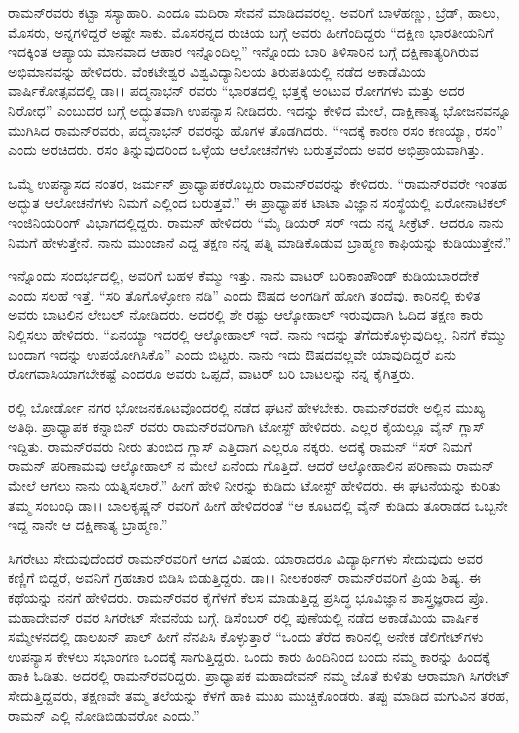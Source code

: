 ರಾಮನ್‍ರವರು ಕಟ್ಟಾ ಸಸ್ಯಾಹಾರಿ. ಎಂದೂ ಮದಿರಾ ಸೇವನೆ ಮಾಡಿದವರಲ್ಲ. ಅವರಿಗೆ ಬಾಳೆಹಣ್ಣು, ಬ್ರೆಡ್, ಹಾಲು, ಮೊಸರು, ಅನ್ನಗಳಿದ್ದರೆ ಅಷ್ಟೇ ಸಾಕು. ಮೊಸರನ್ನದ ರುಚಿಯ ಬಗ್ಗೆ ಅವರು ಹೀಗೆಂದಿದ್ದರು\enginline{--} “ದಕ್ಷಿಣ ಭಾರತೀಯನಿಗೆ ಇದಕ್ಕಿಂತ ಆಪ್ಯಾಯ ಮಾನವಾದ ಆಹಾರ ಇನ್ನೊಂದಿಲ್ಲ” ಇನ್ನೊಂದು ಬಾರಿ ತಿಳಿಸಾರಿನ ಬಗ್ಗೆ ದಕ್ಷಿಣಾತ್ಯರಿಗಿರುವ ಅಭಿಮಾನವನ್ನು ಹೇಳಿದರು. ವೆಂಕಟೇಶ್ವರ ವಿಶ್ವವಿದ್ಯಾನಿಲಯ ತಿರುಪತಿಯಲ್ಲಿ ನಡೆದ ಅಕಾಡೆಮಿಯ ವಾರ್ಷಿಕೋತ್ಸವದಲ್ಲಿ ಡಾ।। ಪದ್ಮನಾಭನ್ ರವರು “ಭಾರತದಲ್ಲಿ ಭತ್ತಕ್ಕೆ ಅಂಟುವ ರೋಗಗಳು ಮತ್ತು ಅದರ ನಿರೋಧ” \textit{} ಎಂಬುದರ ಬಗ್ಗೆ ಅದ್ಭುತವಾಗಿ ಉಪನ್ಯಾಸ ನೀಡಿದರು. ಇದನ್ನು ಕೇಳಿದ ಮೇಲೆ, ದಾಕ್ಷಿಣಾತ್ಯ ಭೋಜನವನ್ನೂ ಮುಗಿಸಿದ ರಾಮನ್‍ರವರು, ಪದ್ಮನಾಭನ್ ರವರನ್ನು ಹೊಗಳ ತೊಡಗಿದರು. “ಇದಕ್ಕೆ ಕಾರಣ ರಸಂ ಕಣಯ್ಯಾ, ರಸಂ” ಎಂದು ಅರಚಿದರು. ರಸಂ ತಿನ್ನುವುದರಿಂದ ಒಳ್ಳೆಯ ಆಲೋಚನೆಗಳು ಬರುತ್ತವೆಂದು ಅವರ ಅಭಿಪ್ರಾಯವಾಗಿತ್ತು.

ಒಮ್ಮೆ ಉಪನ್ಯಾಸದ ನಂತರ, ಜರ್ಮನ್ ಪ್ರಾಧ್ಯಾಪಕರೊಬ್ಬರು ರಾಮನ್‍ರವರನ್ನು ಕೇಳಿದರು. “ರಾಮನ್‍ರವರೇ ಇಂತಹ ಅದ್ಭುತ ಆಲೋಚನೆಗಳು ನಿಮಗೆ ಎಲ್ಲಿಂದ ಬರುತ್ತವೆ.” ಈ ಪ್ರಾಧ್ಯಾಪಕ ಟಾಟಾ ವಿಜ್ಞಾನ ಸಂಸ್ಥೆಯಲ್ಲಿ ಏರೋನಾಟಿಕಲ್ ಇಂಜಿನಿಯರಿಂಗ್ ವಿಭಾಗದಲ್ಲಿದ್ದರು. ರಾಮನ್ ಹೇಳಿದರು\enginline{--} “ಮೈ ಡಿಯರ್ ಸರ್ ಇದು ನನ್ನ ಸೀಕ್ರೆಟ್. ಆದರೂ ನಾನು ನಿಮಗೆ ಹೇಳುತ್ತೇನೆ. ನಾನು ಮುಂಜಾನೆ ಎದ್ದ ತಕ್ಷಣ ನನ್ನ ಪತ್ನಿ ಮಾಡಿಕೊಡುವ ಬ್ರಾಹ್ಮಣ ಕಾಫಿಯನ್ನು ಕುಡಿಯುತ್ತೇನೆ.” 

ಇನ್ನೊಂದು ಸಂದರ್ಭದಲ್ಲಿ, ಅವರಿಗೆ ಬಹಳ ಕೆಮ್ಮು ಇತ್ತು. ನಾನು ವಾಟರ್ ಬರಿಕಾಂಪೌಂಡ್ ಕುಡಿಯಬಾರದೇಕೆ ಎಂದು ಸಲಹೆ ಇತ್ತೆ. “ಸರಿ ತೊಗೊಳ್ಳೋಣ ನಡಿ” ಎಂದು ಔಷದ ಅಂಗಡಿಗೆ ಹೋಗಿ ತಂದೆವು. ಕಾರಿನಲ್ಲಿ ಕುಳಿತ ಅವರು ಬಾಟಲಿನ ಲೇಬಲ್ ನೋಡಿದರು. ಅದರಲ್ಲಿ ಶೇ  ರಷ್ಟು ಆಲ್ಕೋಹಾಲ್ ಇರುವುದಾಗಿ ಓದಿದ ತಕ್ಷಣ ಕಾರು ನಿಲ್ಲಿಸಲು ಹೇಳಿದರು. “ಏನಯ್ಯಾ ಇದರಲ್ಲಿ ಆಲ್ಕೋಹಾಲ್ ಇದೆ. ನಾನು ಇದನ್ನು ತೆಗೆದುಕೊಳ್ಳುವುದಿಲ್ಲ. ನಿನಗೆ ಕೆಮ್ಮು ಬಂದಾಗ ಇದನ್ನು ಉಪಯೋಗಿಸಿಕೊ” ಎಂದು ಬಿಟ್ಟರು. ನಾನು ಇದು ಔಷದವಲ್ಲವೇ ಯಾವುದಿದ್ದರೆ ಏನು ರೋಗವಾಸಿಯಾಗಬೇಕಷ್ಟೆ ಎಂದರೂ ಅವರು ಒಪ್ಪದೆ, ವಾಟರ್ ಬರಿ ಬಾಟಲನ್ನು ನನ್ನ ಕೈಗಿತ್ತರು.

ರಲ್ಲಿ ಬೋರ್ಡೋ ನಗರ ಭೋಜನಕೂಟವೊಂದರಲ್ಲಿ ನಡೆದ ಘಟನೆ ಹೇಳಬೇಕು. ರಾಮನ್‍ರವರೇ ಅಲ್ಲಿನ ಮುಖ್ಯ ಅತಿಥಿ. ಪ್ರಾಧ್ಯಾಪಕ ಕನ್ನಾಬಿನ್ ರವರು ರಾಮನ್‍ರವರಿಗಾಗಿ ಟೋಸ್ಟ್ ಹೇಳಿದರು. ಎಲ್ಲರ ಕೈಯಲ್ಲೂ ವೈನ್ ಗ್ಲಾಸ್ ಇದ್ದಿತು. ರಾಮನ್‍ರವರು ನೀರು ತುಂಬಿದ ಗ್ಲಾಸ್ ಎತ್ತಿದಾಗ ಎಲ್ಲರೂ ನಕ್ಕರು. ಅದಕ್ಕೆ ರಾಮನ್ \enginline{--}“ಸರ್ ನಿಮಗೆ ರಾಮನ್ ಪರಿಣಾಮವು ಆಲ್ಕೋಹಾಲ್ ನ ಮೇಲೆ ಏನೆಂದು ಗೊತ್ತಿದೆ. ಆದರೆ ಆಲ್ಕೋಹಾಲಿನ ಪರಿಣಾಮ ರಾಮನ್ ಮೇಲೆ ಆಗಲು ನಾನು ಯತ್ನಿಸಲಾರೆ.” ಹೀಗೆ ಹೇಳಿ ನೀರನ್ನು ಕುಡಿದು ಟೋಸ್ಟ್ ಹೇಳಿದರು. ಈ ಘಟನೆಯನ್ನು ಕುರಿತು ತಮ್ಮ ಸಂಬಂಧಿ ಡಾ।। ಬಾಲಕೃಷ್ಣನ್ ರವರಿಗೆ ಹೀಗೆ ಹೇಳಿದರಂತೆ\enginline{--} “ಆ ಕೂಟದಲ್ಲಿ ವೈನ್ ಕುಡಿದು ತೂರಾಡದ ಒಬ್ಬನೇ ಇದ್ದ\enginline{--} ನಾನೇ ಆ ದಕ್ಷಿಣಾತ್ಯ ಬ್ರಾಹ್ಮಣ.”

ಸಿಗರೇಟು ಸೇದುವುದೆಂದರೆ ರಾಮನ್‍ರವರಿಗೆ ಆಗದ ವಿಷಯ. ಯಾರಾದರೂ ವಿದ್ಯಾರ್ಥಿಗಳು ಸೇದುವುದು ಅವರ ಕಣ್ಣಿಗೆ ಬಿದ್ದರೆ, ಅವನಿಗೆ ಗ್ರಹಚಾರ ಬಿಡಿಸಿ ಬಿಡುತ್ತಿದ್ದರು. ಡಾ।। ನೀಲಕಂಠನ್ ರಾಮನ್‍ರವರಿಗೆ ಪ್ರಿಯ ಶಿಷ್ಯ. ಈ ಕಥೆಯನ್ನು ನನಗೆ ಹೇಳಿದರು. ರಾಮನ್‍ರವರ ಕೈಗೆಳಗೆ ಕೆಲಸ\- ಮಾಡುತ್ತಿದ್ದ ಪ್ರಸಿದ್ಧ ಭೂವಿಜ್ಞಾನ ಶಾಸ್ತ್ರಜ್ಞರಾದ ಪ್ರೊ. ಮಹಾದೇವನ್ ರವರ ಸಿಗರೇಟ್ ಸೇವನೆಯ ಬಗ್ಗೆ. ಡಿಸೆಂಬರ್ ರಲ್ಲಿ ಪುಣೆಯಲ್ಲಿ ನಡೆದ ಅಕಾಡೆಮಿಯ ವಾರ್ಷಿಕ ಸಮ್ಮೇಳನದಲ್ಲಿ ಡಾಲಖನ್ ಪಾಲ್ ಹೀಗೆ ನೆನಪಿಸಿ ಕೊಳ್ಳುತ್ತಾರೆ\enginline{--} “ಒಂದು ತೆರೆದ ಕಾರಿನಲ್ಲಿ ಅನೇಕ ಡೆಲಿಗೇಟ್‌ಗಳು ಉಪನ್ಯಾಸ ಕೇಳಲು ಸಭಾಂಗಣ ಒಂದಕ್ಕೆ ಸಾಗುತ್ತಿದ್ದರು. ಒಂದು ಕಾರು ಹಿಂದಿನಿಂದ ಬಂದು ನಮ್ಮ ಕಾರನ್ನು ಹಿಂದಕ್ಕೆ ಹಾಕಿ ಓಡಿತು. ಅದರಲ್ಲಿ ರಾಮನ್‍ರವರಿದ್ದರು. ಪ್ರಾಧ್ಯಾಪಕ ಮಹಾದೇವನ್ ನಮ್ಮ ಜೊತೆ ಕುಳಿತು ಆರಾಮಾಗಿ ಸಿಗರೇಟ್ ಸೇದುತ್ತಿದ್ದವರು, ತಕ್ಷಣವೇ ತಮ್ಮ ತಲೆಯನ್ನು ಕೆಳಗೆ ಹಾಕಿ ಮುಖ ಮುಚ್ಚಿಕೊಂಡರು. ತಪ್ಪು ಮಾಡಿದ ಮಗುವಿನ ತರಹ, ರಾಮನ್ ಎಲ್ಲಿ ನೋಡಿಬಿಡುವರೋ ಎಂದು.”

